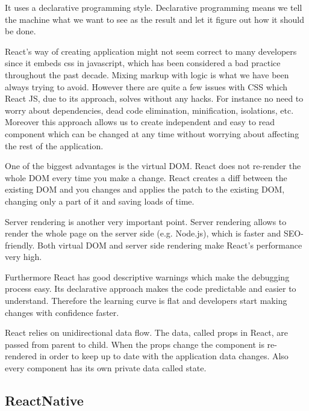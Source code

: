 \documentclass[thesis=M,english]{FITthesis}[2012/10/20]
\begin{document}
It uses a declarative programming style. Declarative programming means we tell the machine what we want to see as the result and let it figure out how it should be done.

React's way of creating application might not seem correct to many developers since it embeds css in javascript, which has been considered a bad practice throughout the past decade. Mixing markup with logic is what we have been always trying to avoid. However there are quite a few issues with CSS which React JS, due to its approach, solves without any hacks. For instance no need to worry about dependencies, dead code elimination, minification, isolations, etc. Moreover this approach allows us to create independent and easy to read component which can be changed at any time without worrying about affecting the rest of the application.

One of the biggest advantages is the virtual DOM. React does not re-render the whole DOM every time you make a change. React creates a diff between the existing DOM and you changes and applies the patch to the existing DOM, changing only a part of it and saving loads of time.

Server rendering is another very important point. Server rendering allows to render the whole page on the server side (e.g. Node.js), which is faster and SEO-friendly. Both virtual DOM and server side rendering make React's performance very high.

Furthermore React has good descriptive warnings which make the debugging process easy. Its declarative approach makes the code predictable and easier to understand. Therefore the learning curve is flat and developers start making changes with confidence faster. 

React relies on unidirectional data flow. The data, called props in React, are passed from parent to child. When the props change the component is re-rendered in order to keep up to date with the application data changes. Also every component has its own private data called state.

\subsection{ReactNative}
\end{document}
